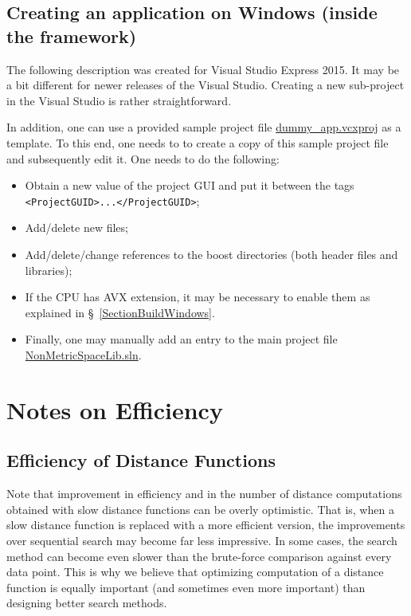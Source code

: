 \documentclass[runningheads,a4paper]{llncs}
\newcommand{\replocfile}{https://github.com/searchivarius/NonMetricSpaceLib/blob/pserv/}
\newcommand{\ttt}[1]{\texttt{#1}}
\begin{document}
\subsection{Creating an application on Windows (inside the framework)}\label{SectionCreateAppWindows}
The following description was created for Visual Studio Express 2015.
It may be a bit different for newer releases of the Visual Studio.
Creating a new sub-project in the Visual Studio is rather straightforward.

In addition, one can use a provided sample project file \href{\replocfile similarity_search/src/dummy_app.vcxproj}{dummy\_app.vcxproj} as a template.
To this end, one needs to to create a copy of this sample project file and subsequently edit it. 
One needs to do the following:
\begin{itemize}
\item Obtain a new value of the project GUI and put it between the tags \newline \ttt{<ProjectGUID>...</ProjectGUID>};
\item Add/delete new files; 
\item Add/delete/change references to the boost directories (both header files and libraries);
\item If the CPU has AVX extension, it may be necessary to enable them
as explained in \S~\ref{SectionBuildWindows}.
\item Finally, one may manually add an entry to the main project
file \href{\replocfile similarity_search/NonMetricSpaceLib.sln}{NonMetricSpaceLib.sln}.
\end{itemize}

\section{Notes on Efficiency}\label{SectionEfficiency}

\subsection{Efficiency of Distance Functions}
Note that improvement in efficiency and in the number of distance computations
obtained with slow distance functions can be overly optimistic.
That is, when a slow distance function is replaced with a more efficient version,
the improvements over sequential search may become far less impressive.
In some cases, the search method can become even slower than the brute-force
comparison against every data point.
This is why we believe that optimizing  computation of a distance function 
is equally important (and sometimes even more important) 
than designing better search methods.
\end{document}
